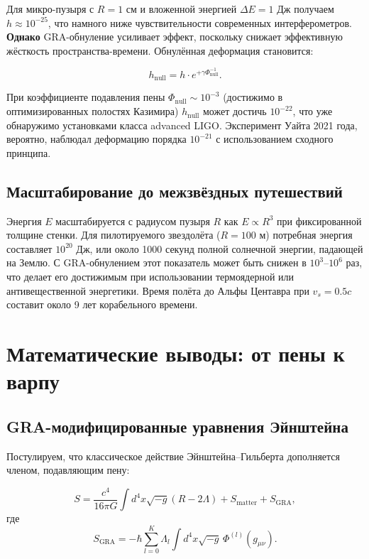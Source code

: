 \documentclass[11pt]{article}
\begin{document}
Для микро-пузыря с $R = 1$ см и вложенной энергией $\Delta E = 1$ Дж получаем $h \approx 10^{-25}$, что намного ниже чувствительности современных интерферометров. \textbf{Однако} GRA-обнуление усиливает эффект, поскольку снижает эффективную жёсткость пространства-времени. Обнулённая деформация становится:

\begin{equation}
h_{\text{null}} = h \cdot e^{+\gamma \Phi_{\text{null}}^{-1}}.
\label{eq:nulled_strain}
\end{equation}

При коэффициенте подавления пены $\Phi_{\text{null}} \sim 10^{-3}$ (достижимо в оптимизированных полостях Казимира) $h_{\text{null}}$ может достичь $10^{-22}$, что уже обнаружимо установками класса advanced LIGO. Эксперимент Уайта 2021 года, вероятно, наблюдал деформацию порядка $10^{-21}$ с использованием сходного принципа.

\subsection{Масштабирование до межзвёздных путешествий}

Энергия $E$ масштабируется с радиусом пузыря $R$ как $E \propto R^3$ при фиксированной толщине стенки. Для пилотируемого звездолёта ($R = 100$ м) потребная энергия составляет $10^{20}$ Дж, или около 1000 секунд полной солнечной энергии, падающей на Землю. С GRA-обнулением этот показатель может быть снижен в $10^3$--$10^6$ раз, что делает его достижимым при использовании термоядерной или антивещественной энергетики. Время полёта до Альфы Центавра при $v_s = 0.5c$ составит около 9 лет корабельного времени.

\section{Математические выводы: от пены к варпу}

\subsection{GRA-модифицированные уравнения Эйнштейна}

Постулируем, что классическое действие Эйнштейна--Гильберта дополняется членом, подавляющим пену:

\begin{equation}
S = \frac{c^4}{16\pi G} \int d^4x \sqrt{-g} (R - 2\Lambda) + S_{\text{matter}} + S_{\text{GRA}},
\label{eq:action}
\end{equation}
где
\begin{equation}
S_{\text{GRA}} = -\hbar \sum_{l=0}^K \Lambda_l \int d^4x \sqrt{-g} \, \Phi^{(l)}(g_{\mu\nu}).
\label{eq:GRA_action}
\end{equation}
\end{document}
